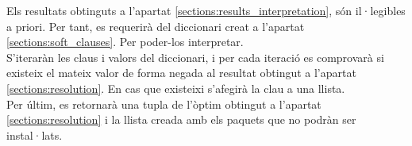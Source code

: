 \documentclass[../informe.tex]{subfiles}
\begin{document}
Els resultats obtinguts a l'apartat \ref{sections:results_interpretation}, són il·legibles a priori. Per tant, es requerirà del diccionari creat a l'apartat \ref{sections:soft_clauses}. Per poder-los interpretar. \\

S'iteraràn les claus i valors del diccionari, i per cada iteració es comprovarà si existeix el mateix valor de forma negada al resultat obtingut a l'apartat \ref{sections:resolution}. En cas que existeixi s'afegirà la clau a una llista. \\

Per últim, es retornarà una tupla de l'òptim obtingut a l'apartat \ref{sections:resolution} i la llista creada amb els paquets que no podràn ser instal·lats.
\end{document}
